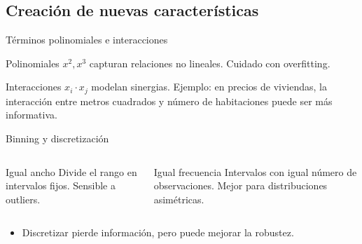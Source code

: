 \documentclass[aspectratio=169, 10pt, xcolor=table]{beamer}
\begin{document}
\subsection{Creación de nuevas características}

\begin{frame}{Términos polinomiales e interacciones}
    \begin{block}{Polinomiales}
        $x^2, x^3$ capturan relaciones no lineales. Cuidado con overfitting.
    \end{block}
    \begin{block}{Interacciones}
        $x_i \cdot x_j$ modelan sinergias. Ejemplo: en precios de viviendas, la interacción entre metros cuadrados y número de habitaciones puede ser más informativa.
    \end{block}
\end{frame}

\begin{frame}{Binning y discretización}
    \begin{columns}[t]
        \begin{block}{Igual ancho}
            Divide el rango en intervalos fijos. Sensible a outliers.
        \end{block}
        \begin{block}{Igual frecuencia}
            Intervalos con igual número de observaciones. Mejor para distribuciones asimétricas.
        \end{block}
    \end{columns}
    \vspace{0.2cm}
    \begin{itemize}
        \item Discretizar pierde información, pero puede mejorar la robustez.
    \end{itemize}
\end{frame}
\end{document}
